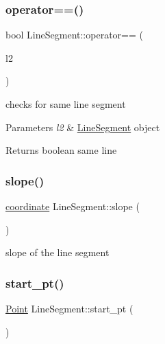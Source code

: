 \subsubsection{\texorpdfstring{operator==()}{operator==()}}
{\footnotesize\ttfamily bool Line\+Segment\+::operator== (\begin{DoxyParamCaption}\item[{const \mbox{\hyperlink{class_line_segment}{Line\+Segment}} \&}]{l2 }\end{DoxyParamCaption})}

checks for same line segment 
\begin{DoxyParams}{Parameters}
{\em l2} & \mbox{\hyperlink{class_line_segment}{Line\+Segment}} object \\
\hline
\end{DoxyParams}
\begin{DoxyReturn}{Returns}
boolean same line 
\end{DoxyReturn}
\mbox{\label{class_line_segment_ad13450e781bedc9ee838726cb57efabb}} 
\subsubsection{\texorpdfstring{slope()}{slope()}}
{\footnotesize\ttfamily \mbox{\hyperlink{primitives_8h_a9949b5198385a93773b854932cb22e08}{coordinate}} Line\+Segment\+::slope (\begin{DoxyParamCaption}{ }\end{DoxyParamCaption})}

slope of the line segment \mbox{\label{class_line_segment_a63afdd3fd0d5a3dc145109a5fe7231c6}} 
\subsubsection{\texorpdfstring{start\_pt()}{start\_pt()}}
{\footnotesize\ttfamily \mbox{\hyperlink{class_point}{Point}} Line\+Segment\+::start\+\_\+pt (\begin{DoxyParamCaption}{ }\end{DoxyParamCaption})}

\mbox{\label{class_line_segment_ad057b30e155ee8a82c7aa425ba22682e}} 
